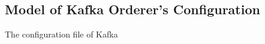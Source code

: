 \documentclass[10pt,journal,compsoc, twoside]{IEEEtran}
\begin{document}
\subsection{Model of Kafka Orderer's Configuration}

The configuration file of Kafka




\ifCLASSOPTIONcaptionsoff
  \newpage
\fi





\vspace{240pt}
\end{document}
